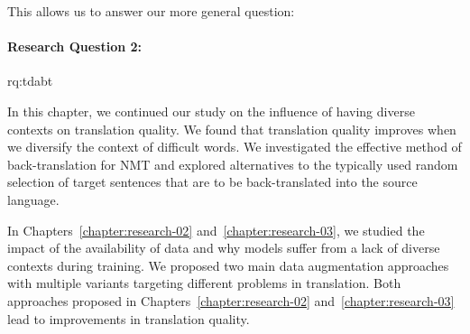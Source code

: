  \noindent  This allows us to answer our more general question: 

\paragraph{Research Question 2:} \acl{rq:tdabt} 

\medskip

 \noindent In this chapter, we continued our study on the influence of having diverse contexts on translation quality. 
 We found that translation quality improves when we diversify the context of difficult words.
We investigated the effective method of back-translation for NMT and explored alternatives to the typically used random selection of target sentences that are to be back-translated into the source language.

\medskip

 \noindent  In Chapters~\ref{chapter:research-02} and~\ref{chapter:research-03}, we studied the impact of the availability of data and why models suffer from {a lack of} diverse contexts during training.
We proposed two main data augmentation approaches with multiple variants targeting different problems in translation.  
Both approaches proposed in Chapters~\ref{chapter:research-02} and~\ref{chapter:research-03} lead to improvements in translation quality.



